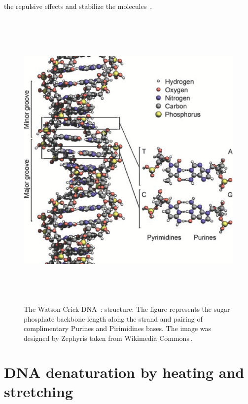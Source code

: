 \documentclass[12pt,masters,final]{UTRGVthesis}
\begin{document}
the repulsive effects and stabilize the molecules~\cite{sugimoto1996improved,ivanov2004statistical}.
%
\newpage
%
\begin{figure}[!h]
  \includegraphics[height=6in,width=1 \textwidth]{dna_structure.eps}
  \caption{\small The Watson-Crick DNA~\protect\cite{watson1953structure}: structure: The figure represents the sugar-phosphate backbone length along the strand and pairing of complimentary Purines and Pirimidines bases. The image was designed by Zephyris taken from Wikimedia Commons\,. }
  \label{fig:DNA structure}
\end{figure}
%
\newpage
\section{DNA denaturation by heating and stretching}
\end{document}

